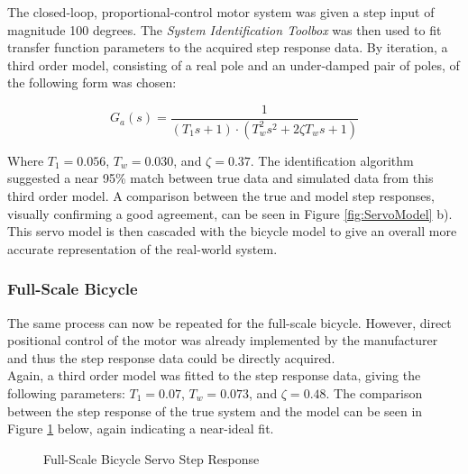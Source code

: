 The closed-loop, proportional-control motor system was given a step input of magnitude 100 degrees. The \textit{System Identification Toolbox} was then used to fit transfer function parameters to the acquired step response data. By iteration, a third order model, consisting of a real pole and an under-damped pair of poles, of the following form was chosen:

\begin{equation}
G_a(s) = \frac{1}{(T_1 s + 1) \cdot (T^2_w s^2 + 2 \zeta T_w s + 1)}
\end{equation}

Where $T_1 = 0.056$, $T_w = 0.030$, and $\zeta = 0.37$. The identification algorithm suggested a near 95\% match between true data and simulated data from this third order model. A comparison between the true and model step responses, visually confirming a good agreement, can be seen in Figure \ref{fig:ServoModel} b). \\

This servo model is then cascaded with the bicycle model to give an overall more accurate representation of the real-world system.

\subsubsection{Full-Scale Bicycle}
The same process can now be repeated for the full-scale bicycle. However, direct positional control of the motor was already implemented by the manufacturer and thus the step response data could be directly acquired. \\
Again, a third order model was fitted to the step response data, giving the following parameters: $T_1 = 0.07$, $T_w = 0.073$, and $\zeta = 0.48$. The comparison between the step response of the true system and the model can be seen in Figure \ref{fig:FSServoModel} below, again indicating a near-ideal fit. 

\begin{figure}[H]
	\centering
	\caption{Full-Scale Bicycle Servo Step Response}
	\label{fig:FSServoModel}
\end{figure}

